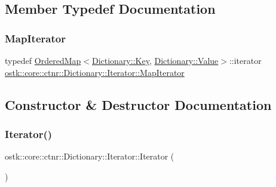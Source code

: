 \subsection{Member Typedef Documentation}
\mbox{\label{classostk_1_1core_1_1ctnr_1_1_dictionary_1_1_iterator_a0d5a95dd4a931ded2d8d156da4499348}} 
\subsubsection{\texorpdfstring{Map\+Iterator}{MapIterator}}
{\footnotesize\ttfamily typedef \hyperlink{namespaceostk_1_1core_1_1ctnr_a13ac23065e75eb425f38bfca4d0c6b38}{Ordered\+Map}$<$\hyperlink{classostk_1_1core_1_1ctnr_1_1_dictionary_aa3b171525039535f342d271d27f90407}{Dictionary\+::\+Key}, \hyperlink{classostk_1_1core_1_1ctnr_1_1_dictionary_ace6ab82268031e972455affca8730c9c}{Dictionary\+::\+Value}$>$\+::iterator \hyperlink{classostk_1_1core_1_1ctnr_1_1_dictionary_1_1_iterator_a0d5a95dd4a931ded2d8d156da4499348}{ostk\+::core\+::ctnr\+::\+Dictionary\+::\+Iterator\+::\+Map\+Iterator}}



\subsection{Constructor \& Destructor Documentation}
\mbox{\label{classostk_1_1core_1_1ctnr_1_1_dictionary_1_1_iterator_a072bec9bfbccbebddaf07b8ed5464342}} 
\subsubsection{\texorpdfstring{Iterator()}{Iterator()}\hspace{0.1cm}{\footnotesize\ttfamily [1/3]}}
{\footnotesize\ttfamily ostk\+::core\+::ctnr\+::\+Dictionary\+::\+Iterator\+::\+Iterator (\begin{DoxyParamCaption}{ }\end{DoxyParamCaption})}


